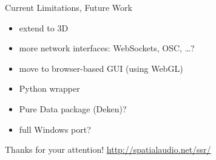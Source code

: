 \documentclass{beamer}
\begin{document}
\begin{frame}%
\begin{center}
\end{center}
\end{frame}

\begin{frame}{Current Limitations, Future Work}
\begin{itemize}
\item extend to 3D
\item more network interfaces: WebSockets, OSC, \dots?
\item move to browser-based GUI (using WebGL)
\item Python wrapper
\item Pure Data package (Deken)?
\item full Windows port?
\end{itemize}
\end{frame}

\begin{frame}
\begin{center}
Thanks for your attention!
\vfill
\url{http://spatialaudio.net/ssr/}
\vfill
\end{center}
\end{frame}
\end{document}
